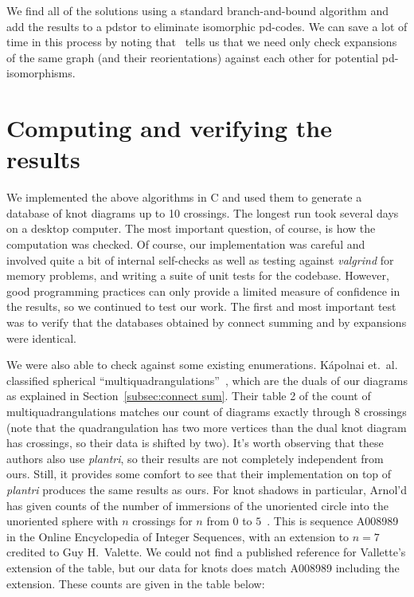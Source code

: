 \documentclass[amsmath,secnumarabic,floatfix,amssymb,nofootinbib,nobibnotes,letterpaper,11pt,tightenlines,showkeys]{revtex4}
\theoremstyle{definition}
\newcommand{\plantri}{\textit{plantri} }
\newcommand{\valgrind}{\textit{valgrind} }
\let\mgp=\marginpar \marginparwidth18mm \marginparsep1mm
\def\marginpar#1{\mgp{\raggedright\tiny #1}}
\let\lbl=\label
\def\label#1{\lbl{#1}\ifinner\else\marginpar{\ref{#1} #1}\ignorespaces\fi}
\begin{document}
We find all of the solutions using a standard branch-and-bound algorithm and add the results to a pdstor to eliminate isomorphic pd-codes. We can save a lot of time in this process by noting that~\label{prop:reduce} tells us that we need only check expansions of the same graph (and their reorientations) against each other for potential pd-isomorphisms. 

\section{Computing and verifying the results}

We implemented the above algorithms in C and used them to generate a database of knot diagrams up to 10 crossings. The longest run took several days on a desktop computer. The most important question, of course, is how the computation was checked. Of course, our implementation was careful and involved quite a bit of internal self-checks as well as testing against \valgrind for memory problems, and writing a suite of unit tests for the codebase. However, good programming practices can only provide a limited measure of confidence in the results, so we continued to test our work. The first and most important test was to verify that the databases obtained by connect summing and by expansions were identical. 

We were also able to check against some existing enumerations. K\'apolnai et.\ al. classified spherical ``multiquadrangulations''~\cite{Kapolnai:2012hs}, which are the duals of our diagrams as explained in Section~\ref{subsec:connect sum}. Their table 2 of the count of multiquadrangulations matches our count of diagrams exactly through $8$ crossings (note that the quadrangulation has two more vertices than the dual knot diagram has crossings, so their data is shifted by two). It's worth observing that these authors also use \emph{plantri}, so their results are not completely independent from ours. Still, it provides some comfort to see that their implementation on top of \plantri produces the same results as ours. For knot shadows in particular, Arnol'd has given counts of the number of immersions of the unoriented circle into the unoriented sphere with $n$ crossings for $n$ from $0$ to $5$~\cite[page 79]{Arnold:1994wr}. This is sequence A008989 in the Online Encyclopedia of Integer Sequences, with an extension to $n=7$ credited to Guy H.\ Valette. We could not find a published reference for Vallette's extension of the table, but our data for knots does match A008989 including the extension. These counts are given in the table below:
\end{document}
